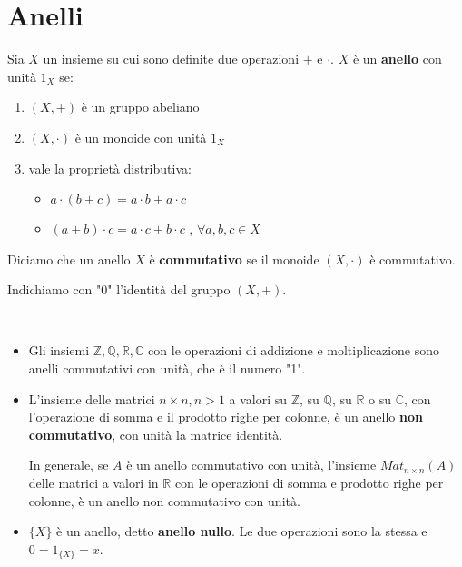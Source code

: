 \documentclass[../main.tex]{subfiles}
\begin{document}
\section{Anelli}

\begin{definition}[Anello]
    Sia $X$ un insieme su cui sono definite due operazioni $+$ e $\cdot $. $X$ è un \textbf{anello} con unità $1_X$ se:
    \begin{enumerate}[label=(\roman*)]
        \item $(X, +)$ è un gruppo abeliano
        \item $(X, \cdot)$ è un monoide con unità $1_X$
        \item vale la proprietà distributiva:
              \begin{itemize}
                  \item $a \cdot (b+c) = a \cdot b + a \cdot c$
                  \item $(a+b) \cdot c = a \cdot c + b \cdot c$ , $\forall a,b,c \in X$
              \end{itemize}
    \end{enumerate}
\end{definition}

\begin{definition}
    Diciamo che un anello $X$ è \textbf{commutativo} se il monoide $(X, \cdot)$ è commutativo.
\end{definition}

Indichiamo con "$0$" l'identità del gruppo $(X, +)$.

\begin{example}
    \
    \begin{itemize}
        \item Gli insiemi $\mathbb{Z} ,\mathbb{Q} ,\mathbb{R} ,\mathbb{C} $ con le operazioni di addizione e moltiplicazione sono anelli commutativi con unità, che è il numero "1".
        \item L'insieme delle matrici $n \times n, n> 1$ a valori su $\mathbb{Z} $, su $\mathbb{Q} $, su $\mathbb{R}$ o su $\mathbb{C} $, con l'operazione di somma e il prodotto righe per colonne, è un anello \textbf{non commutativo}, con unità la matrice identità.

              In generale, se $A$ è un anello commutativo con unità, l'insieme $Mat_{n \times n}(A)$ delle matrici a valori in $\mathbb{R} $ con le operazioni di somma e prodotto righe per colonne, è un anello non commutativo con unità.
              \item$\{X\}$ è un anello, detto \textbf{anello nullo}. Le due operazioni sono la stessa e $0 = 1_{\{X\}} = x$.
    \end{itemize}
\end{example}
\end{document}

